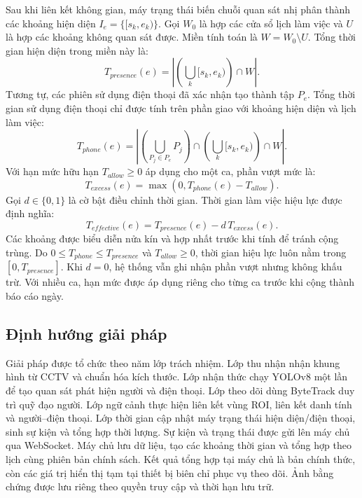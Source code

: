 Sau khi liên kết không gian, máy trạng thái biến chuỗi quan sát nhị phân thành các khoảng hiện diện $I_e=\{[s_k,e_k)\}$. Gọi $W_0$ là hợp các cửa sổ lịch làm việc và $U$ là hợp các khoảng không quan sát được. Miền tính toán là $W=W_0\setminus U$. Tổng thời gian hiện diện trong miền này là:
\begin{equation}
 T_{presence}(e)=\left|\left(\bigcup_k [s_k,e_k)\right)\cap W\right|.
 \label{eq:presence}
\end{equation}
Tương tự, các phiên sử dụng điện thoại đã xác nhận tạo thành tập $P_e$. Tổng thời gian sử dụng điện thoại chỉ được tính trên phần giao với khoảng hiện diện và lịch làm việc:
\begin{equation}
 T_{phone}(e)=\left|\left(\bigcup_{P_j\in P_e} P_j\right)\cap\left(\bigcup_k [s_k,e_k)\right)\cap W\right|.
 \label{eq:phone}
\end{equation}
Với hạn mức hữu hạn $T_{allow}\geq0$ áp dụng cho một ca, phần vượt mức là:
\begin{equation}
 T_{excess}(e)=\max(0,T_{phone}(e)-T_{allow}).
 \label{eq:excess}
\end{equation}
Gọi $d\in\{0,1\}$ là cờ bật điều chỉnh thời gian. Thời gian làm việc hiệu lực được định nghĩa:
\begin{equation}
 T_{effective}(e)=T_{presence}(e)-d\,T_{excess}(e).
 \label{eq:effective}
\end{equation}
Các khoảng được biểu diễn nửa kín và hợp nhất trước khi tính để tránh cộng trùng. Do $0\leq T_{phone}\leq T_{presence}$ và $T_{allow}\geq0$, thời gian hiệu lực luôn nằm trong $[0,T_{presence}]$. Khi $d=0$, hệ thống vẫn ghi nhận phần vượt nhưng không khấu trừ. Với nhiều ca, hạn mức được áp dụng riêng cho từng ca trước khi cộng thành báo cáo ngày.

\subsection{Định hướng giải pháp}
Giải pháp được tổ chức theo năm lớp trách nhiệm. Lớp thu nhận nhận khung hình từ CCTV và chuẩn hóa kích thước. Lớp nhận thức chạy YOLOv8 một lần để tạo quan sát phát hiện người và điện thoại. Lớp theo dõi dùng ByteTrack duy trì quỹ đạo người. Lớp ngữ cảnh thực hiện liên kết vùng ROI, liên kết danh tính và người--điện thoại. Lớp thời gian cập nhật máy trạng thái hiện diện/điện thoại, sinh sự kiện và tổng hợp thời lượng. Sự kiện và trạng thái được gửi lên máy chủ qua WebSocket. Máy chủ lưu dữ liệu, tạo các khoảng thời gian và tổng hợp theo lịch cùng phiên bản chính sách. Kết quả tổng hợp tại máy chủ là bản chính thức, còn các giá trị hiển thị tạm tại thiết bị biên chỉ phục vụ theo dõi. Ảnh bằng chứng được lưu riêng theo quyền truy cập và thời hạn lưu trữ.

